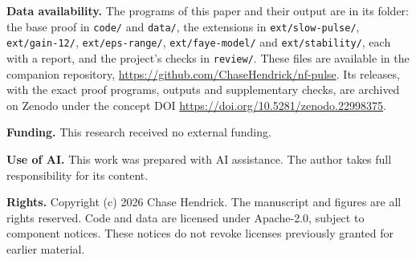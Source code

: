 \documentclass[11pt]{article}
\theoremstyle{definition}
\begin{document}
\medskip
{\raggedright\noindent\textbf{Data availability.} The programs of this paper and their output are in its folder: the base proof in \texttt{code/} and \texttt{data/}, the extensions in \texttt{ext/slow-pulse/}, \texttt{ext/gain-12/}, \texttt{ext/eps-range/}, \texttt{ext/faye-model/} and \texttt{ext/stability/}, each with a report, and the project's checks in \texttt{review/}. These files are available in the companion repository, \url{https://github.com/ChaseHendrick/nf-pulse}. Its releases, with the exact proof programs, outputs and supplementary checks, are archived on Zenodo under the concept DOI \url{https://doi.org/10.5281/zenodo.22998375}.\par}

\noindent\textbf{Funding.} This research received no external funding.

\noindent\textbf{Use of AI.} This work was prepared with AI assistance. The author takes full responsibility for its content.

{\raggedright\noindent\textbf{Rights.} Copyright (c) 2026 Chase Hendrick. The manuscript and figures are all rights reserved. Code and data are licensed under Apache-2.0, subject to component notices. These notices do not revoke licenses previously granted for earlier material.\par}
\end{document}
